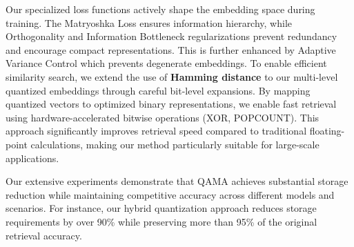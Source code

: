 Our specialized loss functions actively shape the embedding space during training. 
The Matryoshka Loss ensures information hierarchy, while Orthogonality and Information Bottleneck regularizations prevent redundancy and encourage compact representations. 
This is further enhanced by Adaptive Variance Control which prevents degenerate embeddings.
To enable efficient similarity search, we extend the use of \textbf{Hamming distance} to our multi-level quantized embeddings through careful bit-level expansions. 
By mapping quantized vectors to optimized binary representations, we enable fast retrieval using hardware-accelerated bitwise operations (XOR, POPCOUNT). 
This approach significantly improves retrieval speed compared to traditional floating-point calculations, making our method particularly suitable for large-scale applications.

Our extensive experiments demonstrate that QAMA achieves substantial storage reduction while maintaining competitive accuracy across different models and scenarios. 
For instance, our hybrid quantization approach reduces storage requirements by over 90\% while preserving more than 95\% of the original retrieval accuracy. 

